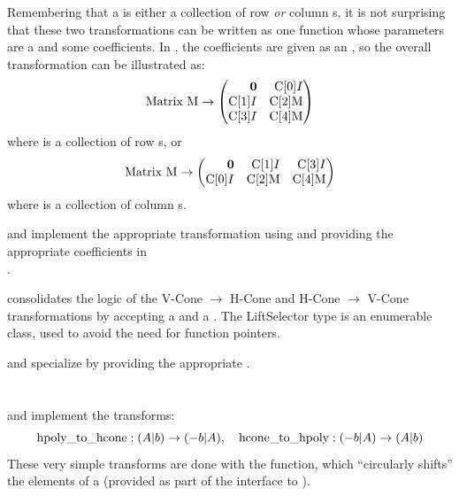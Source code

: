 Remembering that a  is either a collection of row \textit{or} column s, it is not surprising that these two transformations can be written as one function whose parameters are a  and some coefficients.  In , the coefficients are given as an , so the overall transformation can be illustrated as:
\newcommand{\CA}[1]{\mli{C[#1]}}
\[ \mli{Matrix M} \to
	\begin{pmatrix*}[r]
		\0 & \CA{0}I \\
		\CA{1}I & \CA{2}\mli{M} \\
		\CA{3}I & \CA{4}\mli{M}
	\end{pmatrix*} \]
where  is a collection of row s, or
\[ \mli{Matrix M} \to
	\begin{pmatrix*}[r]
		\0 & \CA{1}I & \CA{3}I \\
		\CA{0}I & \CA{2}\mli{M} & \CA{4}\mli{M}
	\end{pmatrix*} \]
where  is a collection of column s.
\lstgeneralizedlift

 and  implement the appropriate transformation using  and providing the appropriate coefficients in \\
.
\lstliftvcone
\lstlifthcone

 consolidates the logic of the V-Cone $\to$ H-Cone and H-Cone $\to$ V-Cone transformations by accepting a  and a .  The LiftSelector type is an enumerable class, used to avoid the need for function pointers.
\lstconetransform

 and  specialize  by providing the appropriate .
\lstvconetohcone
\lsthconetovcone

\section{}

 and  implement the  transforms:
\[ \mli{hpoly_to_hcone}: (A|b) \to (-b|A),\quad \mli{hcone_to_hpoly} : (-b|A) \to (A|b) \]
These very simple transforms are done with the  function, which ``circularly shifts'' the elements of a  (provided as part of the interface to ).
\lsthpolytohcone
\lsthconetohpoly

